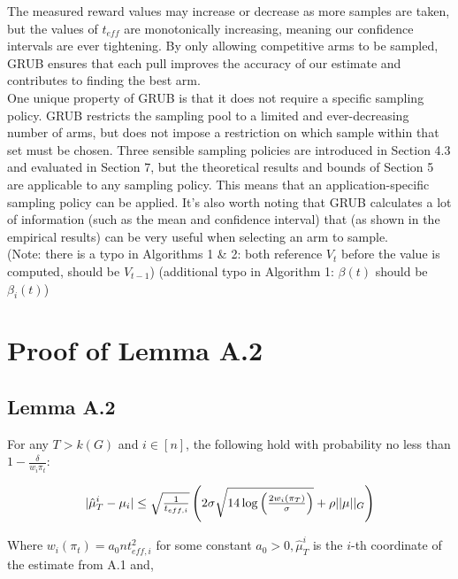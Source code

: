 \documentclass{article}[12pt]
\begin{document}
The measured reward values may increase or decrease as more samples are taken, but the values of $t_{eff}$ are monotonically increasing, meaning our confidence intervals are ever tightening.
By only allowing competitive arms to be sampled, GRUB ensures that each pull improves the accuracy of our estimate and contributes to finding the best arm. \\

One unique property of GRUB is that it does not require a specific sampling policy.
GRUB restricts the sampling pool to a limited and ever-decreasing number of arms, but does not impose a restriction on which sample within that set must be chosen.
Three sensible sampling policies are introduced in Section 4.3 and evaluated in Section 7, but the theoretical results and bounds of Section 5 are applicable to any sampling policy.
This means that an application-specific sampling policy can be applied.
It’s also worth noting that GRUB calculates a lot of information (such as the mean and confidence interval) that (as shown in the empirical results) can be very useful when selecting an arm to sample. \\

(Note: there is a typo in Algorithms 1 \& 2: both reference $V_t$ before the value is computed, should be $V_{t-1}$)
(additional typo in Algorithm 1:  $\beta(t)$ should be $\beta_i(t)$)

\pagebreak

\section{Proof of Lemma A.2}

\subsection{Lemma A.2}

For any $T > k(G)$ and $i \in [n]$, the following hold with probability no less than $1- \tfrac{\delta}{w_i \pi_t}$:

\begin{equation}
 |\hat{\mu}^{i}_{T} - \mu_{i}| \leq \sqrt{\tfrac{1}{t_{eff,i}}}\left( 2\sigma \sqrt{14 \log \left( \tfrac{2 w_i (\boldmath{\pi_T})}{\sigma} \right)} + \rho ||\boldmath{\mu}||_G \right)
\end{equation}


Where $w_i(\pi_t) = a_0 n t_{eff,i}^2$ for some constant $a_0 > 0, \hat{\mu}^i_T$ is the $i$-th coordinate of the estimate from A.1 and,
\end{document}
